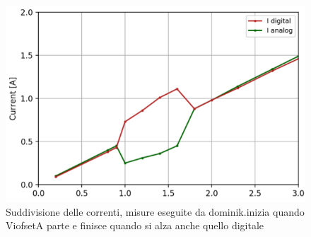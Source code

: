 \begin{figure}
\centering
\includegraphics[scale=.4]{Immagini/CurrentSharing}
\caption{Suddivisione delle correnti, misure eseguite da dominik.inizia quando ViofsetA parte e finisce quando si alza anche quello digitale}%
\label{CurrentSharing}
\end{figure}

